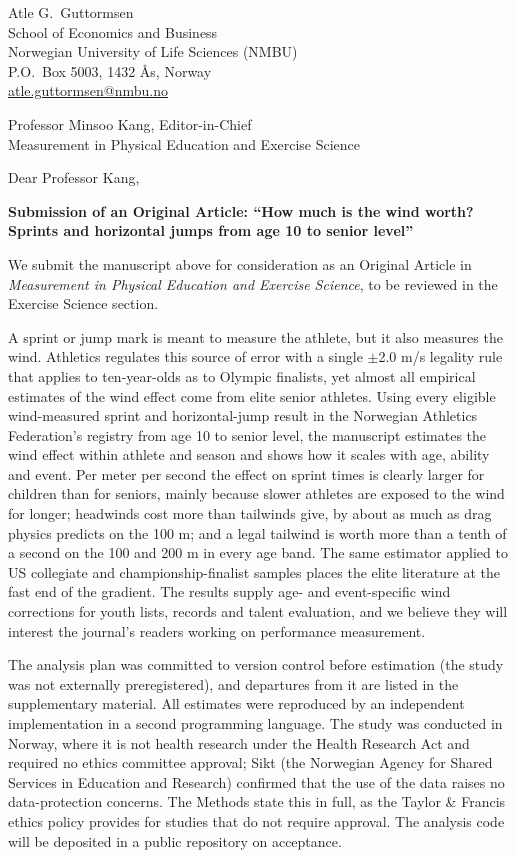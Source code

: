 \documentclass[11pt,a4paper]{article}
\begin{document}
Atle G.\ Guttormsen\\
School of Economics and Business\\
Norwegian University of Life Sciences (NMBU)\\
P.O.\ Box 5003, 1432 Ås, Norway\\
\href{mailto:atle.guttormsen@nmbu.no}{atle.guttormsen@nmbu.no}

\bigskip
Professor Minsoo Kang, Editor-in-Chief\\
Measurement in Physical Education and Exercise Science

\bigskip
Dear Professor Kang,

\textbf{Submission of an Original Article: ``How much is the wind worth? Sprints and horizontal jumps from age 10 to senior level''}

We submit the manuscript above for consideration as an Original Article in \emph{Measurement in Physical Education and Exercise Science}, to be reviewed in the Exercise Science section.

A sprint or jump mark is meant to measure the athlete, but it also measures the wind. Athletics regulates this source of error with a single $\pm$2.0 m/s legality rule that applies to ten-year-olds as to Olympic finalists, yet almost all empirical estimates of the wind effect come from elite senior athletes. Using every eligible wind-measured sprint and horizontal-jump result in the Norwegian Athletics Federation's registry from age 10 to senior level, the manuscript estimates the wind effect within athlete and season and shows how it scales with age, ability and event. Per meter per second the effect on sprint times is clearly larger for children than for seniors, mainly because slower athletes are exposed to the wind for longer; headwinds cost more than tailwinds give, by about as much as drag physics predicts on the 100 m; and a legal tailwind is worth more than a tenth of a second on the 100 and 200 m in every age band. The same estimator applied to US collegiate and championship-finalist samples places the elite literature at the fast end of the gradient. The results supply age- and event-specific wind corrections for youth lists, records and talent evaluation, and we believe they will interest the journal's readers working on performance measurement.

The analysis plan was committed to version control before estimation (the study was not externally preregistered), and departures from it are listed in the supplementary material. All estimates were reproduced by an independent implementation in a second programming language. The study was conducted in Norway, where it is not health research under the Health Research Act and required no ethics committee approval; Sikt (the Norwegian Agency for Shared Services in Education and Research) confirmed that the use of the data raises no data-protection concerns. The Methods state this in full, as the Taylor \& Francis ethics policy provides for studies that do not require approval. The analysis code will be deposited in a public repository on acceptance.
\end{document}
